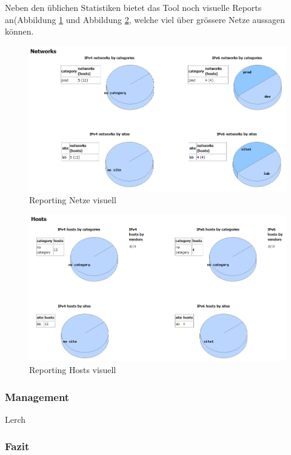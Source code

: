 \documentclass[11pt,a4paper,parskip=half]{scrartcl}
\begin{document}
Neben den üblichen Statistiken bietet das Tool noch visuelle Reports an(Abbildung \ref{fig:visual_netz} und Abbildung \ref{fig:visual_host}, welche viel über grössere Netze aussagen können.
\begin{figure}[H]
\centering
\includegraphics[width=1.0\textwidth]{Phase3/Report_Network_Visualized.PNG}
\caption{Reporting Netze visuell}
\label{fig:visual_netz}
\end{figure}

\begin{figure}[H]
\centering
\includegraphics[width=1.0\textwidth]{Phase3/Report_Hosts_Visualized.PNG}
\caption{Reporting Hosts visuell}
\label{fig:visual_host}
\end{figure}




\subsubsection{Management}
Lerch
\subsubsection{Fazit}
\end{document}
